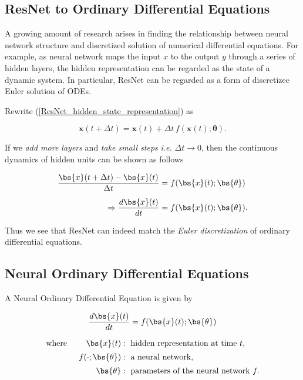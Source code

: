\subsection{ResNet to Ordinary Differential Equations}

A growing amount of research arises in finding the relationship between neural network structure and discretized solution of numerical differential equations. For example, as neural network maps the input $x$ to the output $y$ through a series of hidden layers, the hidden representation can be regarded as the state of a dynamic system. In particular, ResNet can be regarded as a form of discretizee Euler
solution of ODEs.

Rewrite (\ref{ResNet_hidden_state_representation}) as

$$\boldsymbol{x}(t+\Delta t) = \boldsymbol{x}(t)+\Delta t\, f(\boldsymbol{x}(t); \boldsymbol{\theta}).$$

If we \textit{add more layers} and \textit{take small steps} \textit{i.e.} $\Delta t \rightarrow 0$, then the
continuous dynamics of hidden units can be shown as follows \cite{chen2019neuralordinarydifferentialequations}

\begin{align}
\dfrac{\bs{x}(t + \Delta t) - \bs{x}(t)}{\Delta t} &= f(\bs{x}(t); \bs{\theta}) \nonumber \\[0.5em]
\Rightarrow \dfrac{d \bs{x}(t)}{dt} &= f(\bs{x}(t); \bs{\theta}).
\end{align}

Thus we see that ResNet can indeed match the \textit{Euler discretization} of ordinary differential equations.


\subsection{Neural Ordinary Differential Equations}

A Neural Ordinary Differential Equation is given by

\begin{equation}\label{NeuralODE}
\dfrac{d \bs{x}(t)}{dt} = f(\bs{x}(t); \bs{\theta})
\end{equation}

\begin{align*}
\text{where } \qquad \bs{x}(t) &: \text{ hidden representation at time }t, \\[0.2em]
f(\cdot; \bs{\theta}) &: \text{ a neural network}, \\[0.2em]
\bs{\theta} &: \text{ parameters of the neural network } f.
\end{align*}


